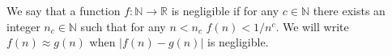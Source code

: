 We say that a function $f:\mathbb{N}\to\mathbb{R}$ is negligible if for any $c\in\mathbb{N}$ there exists an integer $n_c\in\mathbb{N}$ such that for any $n< n_c$ $f(n)<1/n^c$. We will write $f(n)\approx g(n)$ when $|f(n)-g(n)|$ is negligible.
